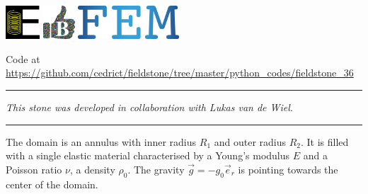 \includegraphics[height=1.25cm]{images/pictograms/elasticity}
\includegraphics[height=1.25cm]{images/pictograms/benchmark}
\includegraphics[height=1.25cm]{images/pictograms/FEM}




\begin{center}
Code at \url{https://github.com/cedrict/fieldstone/tree/master/python_codes/fieldstone_36}
\end{center}

\par\noindent\rule{\textwidth}{0.4pt}

{\sl This stone was developed in collaboration with Lukas van de Wiel}.

\par\noindent\rule{\textwidth}{0.4pt}


The domain is an annulus with inner radius $R_1$ and outer radius $R_2$. It is filled with a 
single elastic material characterised by a Young's modulus $E$ and a Poisson ratio $\nu$, a
density $\rho_0$. The gravity ${\vec g}=-g_0 {\vec e}_r$ is pointing towards the center of the domain.

